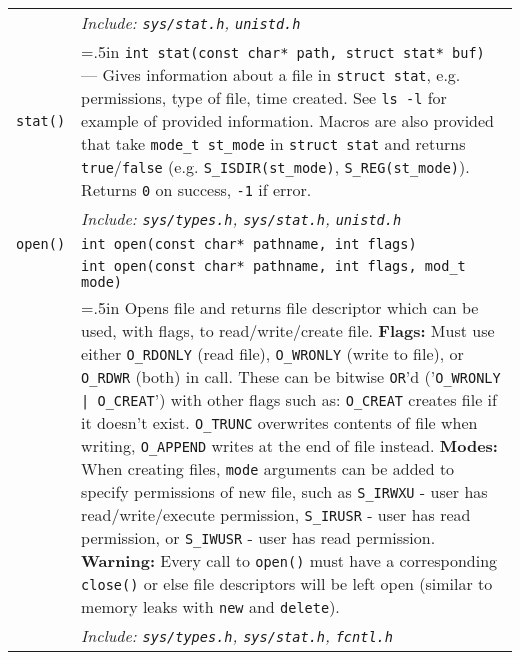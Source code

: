 \documentclass{article}
\newcommand{\indenth}[1][.5]{\hangindent=#1in
                         \hangafter=1 }
\begin{document}
\begin{longtabu}{|p{.9in}|p{6.3in}<{\strut}|}
        \\
    & \hspace{.5in}\it Include: \rm\texttt{sys/stat.h}, \texttt{unistd.h}
        \\
    \texttt{stat()} & \indenth\texttt{int stat(const char* path,  struct stat* buf)} --- Gives information about a file in \texttt{struct stat}, e.g. permissions, type of file, time created. See \texttt{ls -l} for example of provided information. Macros are also provided that take \texttt{mode\_t st\_mode} in \texttt{struct stat} and returns \texttt{true}/\texttt{false} (e.g. \texttt{S\_ISDIR(st\_mode)}, \texttt{S\_REG(st\_mode)}). Returns \texttt{0} on success, \texttt{-1} if error.
        \\
    & \hspace{.5in}\it Include: \rm\texttt{sys/types.h}, \texttt{sys/stat.h}, \texttt{unistd.h}
        \\ \hline
    \texttt{open()} & \texttt{int open(const char* pathname, int flags)}
        \\
    & \texttt{int open(const char* pathname, int flags, mod\_t mode)}
        \\
    & \indenth\hspace{.5in}Opens file and returns file descriptor which can be used, with flags, to read/write/create file. 
    \newline\textbf{Flags:} Must use either \texttt{O\_RDONLY} (read file), \texttt{O\_WRONLY} (write to file), or \texttt{O\_RDWR} (both) in call. These can be bitwise \texttt{OR}'d ('\texttt{O\_WRONLY | O\_CREAT}') with other flags such as:  \texttt{O\_CREAT} creates file if it doesn't exist. \texttt{O\_TRUNC} overwrites contents of file when writing, \texttt{O\_APPEND} writes at the end of file instead. 
    \newline\textbf{Modes:} When creating files, \texttt{mode} arguments can be added to specify permissions of new file, such as \texttt{S\_IRWXU} - user has read/write/execute permission, \texttt{S\_IRUSR} - user has read permission, or \texttt{S\_IWUSR} - user has read permission.
    \newline\textbf{Warning:} Every call to \texttt{open()} must have a corresponding \texttt{close()} or else file descriptors will be left open (similar to memory leaks with \texttt{new} and \texttt{delete}).
        \\
    & \hspace{.5in}\it Include: \rm\texttt{sys/types.h}, \texttt{sys/stat.h}, \texttt{fcntl.h}

\end{longtabu}
\end{document}
